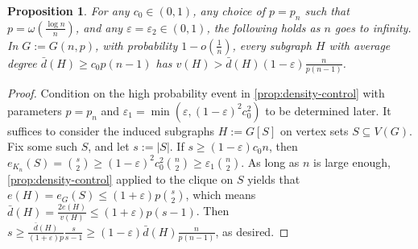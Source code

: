 \documentclass[12pt]{amsart}
\newtheorem{prop}[theorem]{Proposition}
\theoremstyle{definition}
\numberwithin{equation}{section}
\begin{document}
\begin{prop}
    \label{prop:degree-bound}
    For any $c_0\in (0, 1)$, any choice of $p=p_n$ such that $p=\omega(\frac{\log n}n)$, and any $\varepsilon=\varepsilon_2\in (0,1)$, the following holds as $n$ goes to infinity. 
    In $G := G(n, p)$, with probability $1-o(\frac{1}{n})$, every subgraph $H$ with average degree $\bar d(H)\ge c_0 p(n-1)$ has $v(H)> \bar d(H)(1-\varepsilon)\frac{n}{p(n-1)}$.
\end{prop}
\begin{proof}
    Condition on the high probability event in \cref{prop:density-control} with parameters $p=p_n$ and $\varepsilon_1=\min(\varepsilon,(1-\varepsilon)^2c_0^2)$ to be determined later. 
    It suffices to consider the induced subgraphs $H:=G[S]$ on vertex sets $S\subseteq V(G)$. Fix some such $S$, and let $s:=|S|$. If $s\ge (1-\varepsilon)c_0 n$, then $e_{K_n}(S)=\binom{s}{2}\ge (1-\varepsilon)^2 c_0^2\binom{n}{2}\ge \varepsilon_1 \binom{n}{2}$. As long as $n$ is large enough, \cref{prop:density-control} applied to the clique on $S$ yields that $e(H)=e_G(S)\le (1+\varepsilon)p\binom{s}{2}$, which means $\bar d(H)=\frac{2e(H)}{v(H)}\le (1+\varepsilon)p(s-1)$. Then $s\ge \frac{\bar d(H)}{(1+\varepsilon)p}\frac{s}{s-1}\ge (1-\varepsilon)\bar d(H) \frac{n}{p(n-1)}$, as desired.
    

\end{proof}
\end{document}
